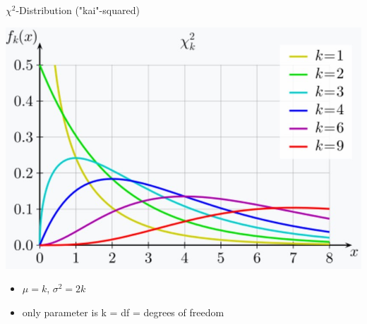 \documentclass{beamer}
\begin{document}
\begin{frame}{$\chi^2$-Distribution ("kai"-squared)}
\begin{center}
    \includegraphics[scale=.45]{img/chi2_distr.jpg}
\end{center}

\begin{itemize}
    \item $\mu = k$, $\sigma^2 = 2k$
    \item only parameter is k = df = degrees of freedom
\end{itemize}
\end{frame}
\end{document}
